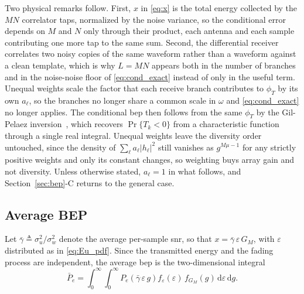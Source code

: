\documentclass[12pt, draftclsnofoot, onecolumn]{IEEEtran}
\newcommand{\rev}[1]{#1}
\newenvironment{revblock}{}{}
\begin{document}
\begin{revblock}
Two physical remarks follow. First, $x$ in \eqref{eq:x} is the total energy
collected by the $MN$ correlator taps, normalized by the noise variance, so the conditional error depends on $M$
and $N$ only through their product, each antenna and each sample contributing
one more tap to the same sum.
Second, the differential receiver correlates two noisy copies of the same
waveform rather than a waveform against a clean template, which is why $L=MN$
appears both in the number of branches and in the noise-noise floor of
\eqref{eq:cond_exact} instead of only in the useful term. Unequal weights scale
the factor that each receive branch contributes to $\phi_T$ by its own $a_\ell$,
so the branches no longer share a common scale in $\omega$ and
\eqref{eq:cond_exact} no longer applies. The conditional \ac{bep} then follows
from the same $\phi_T$ by the Gil-Pelaez inversion~\cite{GilPelaez_1951}, which
recovers $\Pr\{T_k<0\}$ from a characteristic function through a single real
integral. Unequal weights leave the diversity order untouched, since the density of
$\sum_\ell a_\ell|h_\ell|^2$ still vanishes as $g^{M\mu-1}$ for any strictly
positive weights and only its constant changes, so weighting buys array gain and
not diversity. Unless otherwise stated, $a_\ell=1$ in what follows, and
Section~\ref{sec:bep}-C returns to the general case.
\end{revblock}

\subsection{Average BEP}

Let $\bar\gamma \triangleq \sigma_u^2/\sigma_w^2$ denote the average per-sample
\ac{snr}, \rev{so that $x=\bar\gamma\,\varepsilon\,G_M$, with $\varepsilon$
distributed as in \eqref{eq:Eu_pdf}}. Since the transmitted energy and the fading process are
independent, the average \ac{bep} is the two-dimensional integral
\begin{equation}
\bar P_e = \int_0^{\infty}\!\!\int_0^{\infty}
P_e\!\left(\bar\gamma\,\varepsilon\,g\right) f_{\varepsilon}(\varepsilon)\,
f_{G_M}(g)\,\mathrm{d}\varepsilon\,\mathrm{d}g .
\label{eq:avg_general}
\end{equation}
\end{document}
